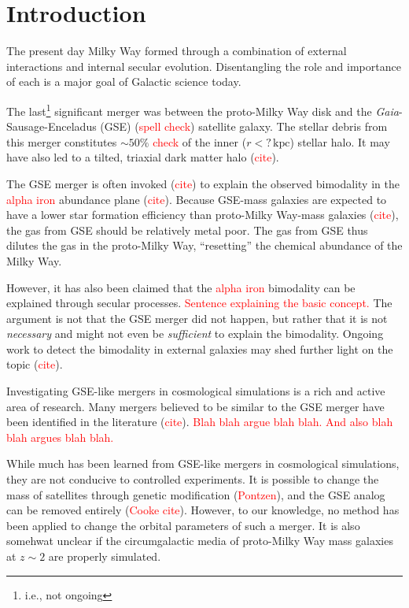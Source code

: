 \documentclass[linenumbers, twocolumn]{aastex631}
\newcommand{\kpc}{\ensuremath{\textrm{kpc}}}
\begin{document}
\section{Introduction} \label{sec:intro}
The present day Milky Way formed through a combination of external interactions
and internal secular evolution. Disentangling the role and importance of each is
a major goal of Galactic science today.

The last\footnote{i.e., not ongoing} significant merger was between the
proto-Milky Way disk and the {\em Gaia}-Sausage-Enceladus (GSE)
(\textcolor{red}{spell check}) satellite galaxy. The stellar debris from this
merger constitutes $\sim50\%$ \textcolor{red}{check} of the inner ($r<?\,\kpc$)
stellar halo. It may have also led to a tilted, triaxial dark matter halo
(\textcolor{red}{cite}).

The GSE merger is often invoked (\textcolor{red}{cite}) to explain the observed
bimodality in the \textcolor{red}{alpha iron} abundance plane
(\textcolor{red}{cite}). Because GSE-mass galaxies are expected to have a lower
star formation efficiency than proto-Milky Way-mass galaxies
(\textcolor{red}{cite}), the gas from GSE should be relatively metal poor. The
gas from GSE thus dilutes the gas in the proto-Milky Way, ``resetting'' the
chemical abundance of the Milky Way.

However, it has also been claimed that the \textcolor{red}{alpha iron}
bimodality can be explained through secular processes. \textcolor{red}{Sentence
explaining the basic concept.} The argument is not that the GSE merger did not
happen, but rather that it is not {\it necessary} and might not even be {\it
sufficient} to explain the bimodality. Ongoing work to detect the bimodality in
external galaxies may shed further light on the topic (\textcolor{red}{cite}).

Investigating GSE-like mergers in cosmological simulations is a rich and active
area of research. Many mergers believed to be similar to the GSE merger have
been identified in the literature (\textcolor{red}{cite}). \textcolor{red}{Blah
blah argue blah blah. And also blah blah argues blah blah.}

While much has been learned from GSE-like mergers in cosmological simulations,
they are not conducive to controlled experiments. It is possible to change the
mass of satellites through genetic modification (\textcolor{red}{Pontzen}), and
the GSE analog can be removed entirely (\textcolor{red}{Cooke cite}). However,
to our knowledge, no method has been applied to change the orbital parameters of
such a merger. It is also somehwat unclear if the circumgalactic media of
proto-Milky Way mass galaxies at $z\sim2$ are properly simulated.
\end{document}
